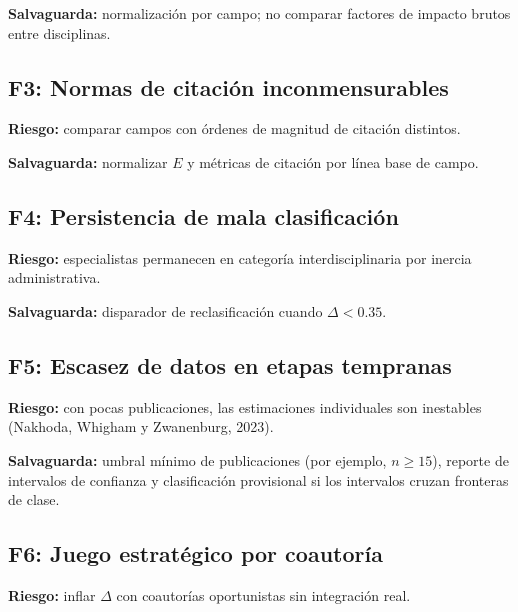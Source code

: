 \documentclass[
]{article}
\begin{document}
\textbf{Salvaguarda:} normalización por campo; no comparar factores de
impacto brutos entre disciplinas.

\hypertarget{f3-normas-de-citaciuxf3n-inconmensurables}{%
\subsection{F3: Normas de citación
inconmensurables}\label{f3-normas-de-citaciuxf3n-inconmensurables}}

\textbf{Riesgo:} comparar campos con órdenes de magnitud de citación
distintos.

\textbf{Salvaguarda:} normalizar \(E\) y métricas de citación por línea
base de campo.

\hypertarget{f4-persistencia-de-mala-clasificaciuxf3n}{%
\subsection{F4: Persistencia de mala
clasificación}\label{f4-persistencia-de-mala-clasificaciuxf3n}}

\textbf{Riesgo:} especialistas permanecen en categoría
interdisciplinaria por inercia administrativa.

\textbf{Salvaguarda:} disparador de reclasificación cuando
\(\Delta < 0.35\).

\hypertarget{f5-escasez-de-datos-en-etapas-tempranas}{%
\subsection{F5: Escasez de datos en etapas
tempranas}\label{f5-escasez-de-datos-en-etapas-tempranas}}

\textbf{Riesgo:} con pocas publicaciones, las estimaciones individuales
son inestables (Nakhoda, Whigham y Zwanenburg, 2023).

\textbf{Salvaguarda:} umbral mínimo de publicaciones (por ejemplo,
\(n \geq 15\)), reporte de intervalos de confianza y clasificación
provisional si los intervalos cruzan fronteras de clase.

\hypertarget{f6-juego-estratuxe9gico-por-coautoruxeda}{%
\subsection{F6: Juego estratégico por
coautoría}\label{f6-juego-estratuxe9gico-por-coautoruxeda}}

\textbf{Riesgo:} inflar \(\Delta\) con coautorías oportunistas sin
integración real.
\end{document}
